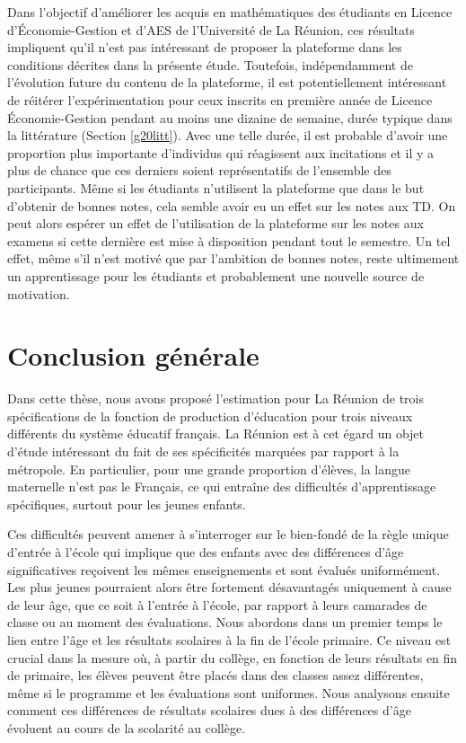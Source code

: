 \documentclass[
]{book}
\begin{document}
\quad Dans l'objectif d'améliorer les acquis en mathématiques des étudiants en Licence d'Économie-Gestion et d'AES de l'Université de La Réunion, ces résultats impliquent qu'il n'est pas intéressant de proposer la plateforme dans les conditions décrites dans la présente étude. Toutefois, indépendamment de l'évolution future du contenu de la plateforme, il est potentiellement intéressant de réitérer l'expérimentation pour ceux inscrits en première année de Licence Économie-Gestion pendant au moins une dizaine de semaine, durée typique dans la littérature (Section \ref{g20litt}). Avec une telle durée, il est probable d'avoir une proportion plus importante d'individus qui réagissent aux incitations et il y a plus de chance que ces derniers soient représentatifs de l'ensemble des participants. Même si les étudiants n'utilisent la plateforme que dans le but d'obtenir de bonnes notes, cela semble avoir eu un effet sur les notes aux TD. On peut alors espérer un effet de l'utilisation de la plateforme sur les notes aux examens si cette dernière est mise à disposition pendant tout le semestre. Un tel effet, même s'il n'est motivé que par l'ambition de bonnes notes, reste ultimement un apprentissage pour les étudiants et probablement une nouvelle source de motivation.

\hypertarget{conclusion-guxe9nuxe9rale}{%
\chapter*{Conclusion générale}\label{conclusion-guxe9nuxe9rale}}

Dans cette thèse, nous avons proposé l'estimation pour La Réunion de trois spécifications de la fonction de production d'éducation pour trois niveaux différents du système éducatif français. La Réunion est à cet égard un objet d'étude intéressant du fait de ses spécificités marquées par rapport à la métropole. En particulier, pour une grande proportion d'élèves, la langue maternelle n'est pas le Français, ce qui entraîne des difficultés d'apprentissage spécifiques, surtout pour les jeunes enfants.

Ces difficultés peuvent amener à s'interroger sur le bien-fondé de la règle unique d'entrée à l'école qui implique que des enfants avec des différences d'âge significatives reçoivent les mêmes enseignements et sont évalués uniformément. Les plus jeunes pourraient alors être fortement désavantagés uniquement à cause de leur âge, que ce soit à l'entrée à l'école, par rapport à leurs camarades de classe ou au moment des évaluations. Nous abordons dans un premier temps le lien entre l'âge et les résultats scolaires à la fin de l'école primaire. Ce niveau est crucial dans la mesure où, à partir du collège, en fonction de leurs résultats en fin de primaire, les élèves peuvent être placés dans des classes assez différentes, même si le programme et les évaluations sont uniformes. Nous analysons ensuite comment ces différences de résultats scolaires dues à des différences d'âge évoluent au cours de la scolarité au collège.
\end{document}
